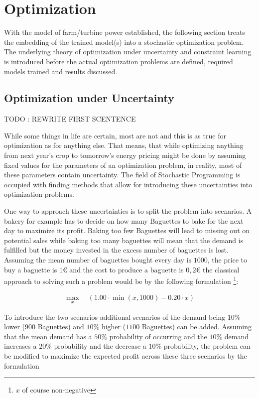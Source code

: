 \chapter{Optimization}\label{section:optimization}

With the model of farm/turbine power established, the following section treats the embedding of the trained model(s)  into a stochastic optimization problem. The underlying theory of optimization under uncertainty and constraint learning is introduced before the actual optimization problems are defined, required models trained and results discussed.

\section{Optimization under Uncertainty}

TODO : REWRITE FIRST SCENTENCE

While some things in life are certain, most are not and this is as true for optimization as for anything else. That means, that while optimizing anything from next year's crop to tomorrow's energy pricing might be done by assuming fixed values for the parameters of an optimization problem, in reality, most of these parameters contain uncertainty. The field of Stochastic Programming is occupied with finding methods that allow for introducing these uncertainties into optimization problems.

One way to approach these uncertainties is to split the problem into scenarios. A bakery for example has to decide on how many Baguettes to bake for the next day to maximize its profit. Baking too few Baguettes will lead to missing out on potential sales while baking too many baguettes will mean that the demand is fulfilled but the money invested in the excess number of baguettes is lost. Assuming the mean number of baguettes bought every day is $1000$, the price to buy a baguette is $1 €$ and the cost to produce a baguette is $0,2 €$ the classical approach to solving such a problem would be by the following formulation \footnote{$x$ of course non-negative}: 


\begin{align*}
	\max_{x} \quad \left( 1.00 \cdot \min(x,1000) - 0.20 \cdot x \right)
\end{align*}


To introduce the two scenarios additional scenarios of the demand being $10\%$ lower ($900$ Baguettes) and $10\%$ higher ($1100$ Baguettes) can be added. Assuming that the mean demand has a $50\%$ probability of occurring and the $10\%$ demand increases a $20\%$ probability and the decrease a $10\%$  probability, the problem can be modified to maximize the expected profit across these three scenarios by the formulation

